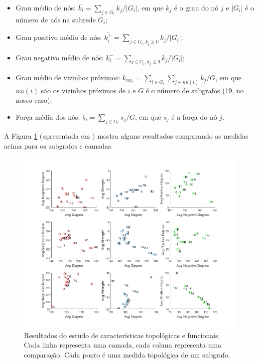\documentclass{article}
\begin{document}
            \begin{itemize}
                \item Grau médio de nós: $\overline{k_i} = \sum_{j \in G_i} k_j / |G_i|$, em que $k_j$ é o grau do nó $j$ e $|G_i|$ é o número de nós na subrede $G_i$;
                \item Grau positivo médio de nós: $\overline{k_i^+} = \sum_{j \in G_i, k_j \ge 0} k_j / |G_i|$;
                \item Grau negativo médio de nós: $\overline{k_i^-} = \sum_{j \in G_i, k_j \le 0} k_j / |G_i|$;
                \item Grau médio de vizinhos próximos: $\overline{k_{nn_i}} = \sum_{i \in G_i} \sum_{j \in nn(i)} k_j / G$, em que $nn(i)$ são os vizinhos próximos de $i$ e $G$ é o número de subgrafos (19, no nosso caso);
                \item Força média dos nós: $\overline{s}_i = \sum_{j \in G_i} s_j / G$, em que $s_j$ é a força do nó $j$.
            \end{itemize}

            A Figura \ref{fig6} (apresentada em \cite{testolin2018deep}) mostra alguns resultados comparando as medidas acima para os subgrafos e camadas.

            \begin{figure}[h!]
                \centering
                \includegraphics[scale=0.35]{Images/Structure vs function.png}
                \caption{Resultados do estudo de características topológicas e funcionais.
                Cada linha representa uma camada, cada coluna representa uma comparação.
                Cada ponto é uma medida topológica de um subgrafo.}
                \label{fig6}
            \end{figure}
\end{document}
